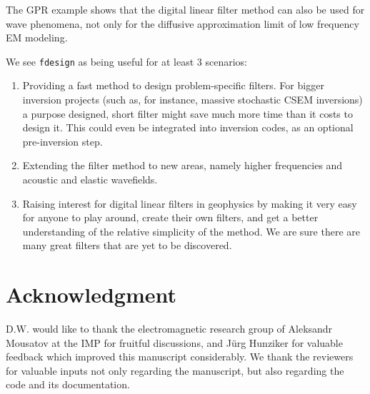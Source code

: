 \documentclass[paper,twocolumn,twoside]{geophysics}
\begin{document}
The GPR example shows that the digital linear filter method can also be used
for wave phenomena, not only for the diffusive approximation limit of low
frequency EM modeling.

We see \texttt{fdesign} as being useful for at least 3 scenarios:
\begin{enumerate}
  \item Providing a fast method to design problem-specific filters. For bigger
    inversion projects (such as, for instance, massive stochastic CSEM
    inversions) a purpose designed, short filter might save much more time than
    it costs to design it. This could even be integrated into inversion codes,
    as an optional pre-inversion step.
  \item Extending the filter method to new areas, namely higher frequencies and
    acoustic and elastic wavefields.
  \item Raising  interest for digital linear filters in geophysics by making it
    very easy for anyone to play around, create their own filters, and get a
    better understanding of the relative simplicity of the method. We are sure
    there are many great filters that are yet to be discovered.
\end{enumerate}

\section{Acknowledgment}

D.W. would like to thank the electromagnetic research group of Aleksandr
Mousatov at the IMP for fruitful discussions, and Jürg Hunziker for valuable
feedback which improved this manuscript considerably. We thank the reviewers
for valuable inputs not only regarding the manuscript, but also regarding the
code and its documentation.
\end{document}
